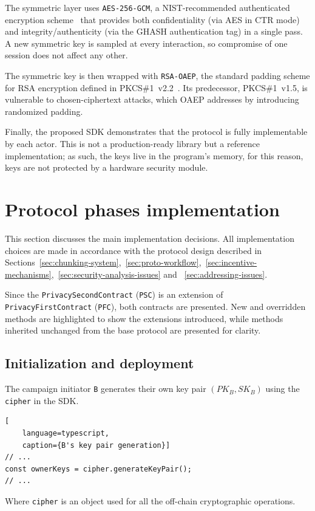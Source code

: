 The symmetric layer uses \texttt{AES-256-GCM}, a NIST-recommended authenticated encryption scheme~\cite{nist-sp-800-38d} that provides both confidentiality (via AES in CTR mode) and integrity/authenticity (via the GHASH authentication tag) in a single pass.
A new symmetric key is sampled at every interaction, so compromise of one session does not affect any other.

The symmetric key is then wrapped with \texttt{RSA-OAEP}, the standard padding scheme for RSA encryption defined in PKCS\#1~v2.2~\cite{rfc8017}.
Its predecessor, PKCS\#1~v1.5, is vulnerable to chosen-ciphertext attacks, which OAEP addresses by introducing randomized padding.

Finally, the proposed SDK demonstrates that the protocol is fully implementable by each actor.
This is not a production-ready library but a reference implementation; as such, the keys live in the program's memory, for this reason, keys are not protected by a hardware security module.

\section{Protocol phases implementation}\label{sec:implementation-protocol-phases}
This section discusses the main implementation decisions.
All implementation choices are made in accordance with the protocol design described in Sections~\ref{sec:chunking-system},~\ref{sec:proto-workflow},~\ref{sec:incentive-mechanisms},~\ref{sec:security-analysis-issues} and ~\ref{sec:addressing-issues}.

Since the \texttt{PrivacySecondContract} (\texttt{PSC}) is an extension of \texttt{PrivacyFirstContract} (\texttt{PFC}), both contracts are presented.
New and overridden methods are highlighted to show the extensions introduced, while methods inherited unchanged from the base protocol are presented for clarity.


\subsection{Initialization and deployment}\label{subsec:implementation-protocol-init}
The campaign initiator \texttt{B} generates their own key pair $(PK_B, SK_B)$ using the \texttt{cipher} in the SDK.
\begin{lstlisting}[
    language=typescript,
    caption={B's key pair generation}]
// ...
const ownerKeys = cipher.generateKeyPair();
// ...
\end{lstlisting}
Where \lstinline{cipher} is an object used for all the off-chain cryptographic operations.

